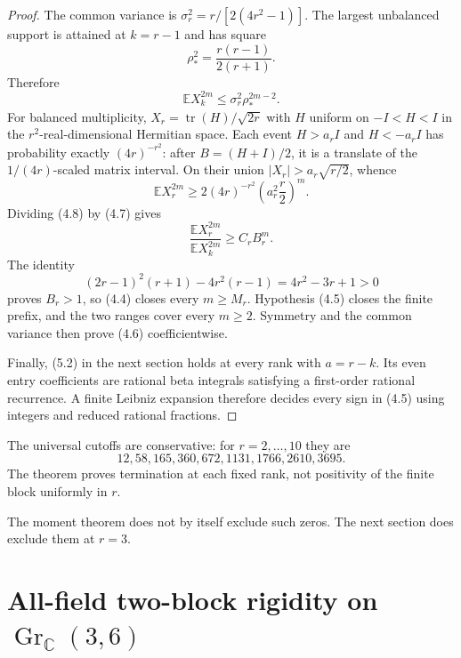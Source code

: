 \documentclass[11pt]{article}
\newcommand{\E}{\mathbb E}
\newcommand{\C}{\mathbb C}
\newcommand{\tr}{\operatorname{tr}}
\newcommand{\Gr}{\operatorname{Gr}}
\begin{document}
\begin{proof}
The common variance is $\sigma_r^2=r/[2(4r^2-1)]$.  The largest unbalanced
support is attained at $k=r-1$ and has square
\[
 \rho_*^2=\frac{r(r-1)}{2(r+1)}.
\]
Therefore
\begin{equation}
 \E X_k^{2m}\le\sigma_r^2\rho_*^{2m-2}.                   \tag{4.7}
\end{equation}
For balanced multiplicity, $X_r=\tr(H)/\sqrt{2r}$ with $H$ uniform on
$-I<H<I$ in the $r^2$-real-dimensional Hermitian space.  Each event
$H>a_rI$ and $H<-a_rI$ has probability exactly $(4r)^{-r^2}$: after
$B=(H+I)/2$, it is a translate of the $1/(4r)$-scaled matrix interval.  On
their union $|X_r|>a_r\sqrt{r/2}$, whence
\begin{equation}
 \E X_r^{2m}\ge2(4r)^{-r^2}\left(a_r^2\frac r2\right)^m. \tag{4.8}
\end{equation}
Dividing (4.8) by (4.7) gives
\begin{equation}
 \frac{\E X_r^{2m}}{\E X_k^{2m}}\ge C_rB_r^m.              \tag{4.9}
\end{equation}
The identity
\[
 (2r-1)^2(r+1)-4r^2(r-1)=4r^2-3r+1>0
\]
proves $B_r>1$, so (4.4) closes every $m\ge M_r$.  Hypothesis (4.5) closes
the finite prefix, and the two ranges cover every $m\ge2$.  Symmetry and the
common variance then prove (4.6) coefficientwise.

Finally, (5.2) in the next section holds at every rank with $a=r-k$.
Its even entry coefficients are rational beta integrals satisfying a
first-order rational recurrence.  A finite Leibniz expansion therefore
decides every sign in (4.5) using integers and reduced rational fractions.
\end{proof}

The universal cutoffs are conservative: for $r=2,\ldots,10$ they are
\begin{equation}
 12,58,165,360,672,1131,1766,2610,3695.                    \tag{4.10}
\end{equation}
The theorem proves termination at each fixed rank, not positivity of the
finite block uniformly in $r$.

The moment theorem does not by itself exclude such zeros.  The next section
does exclude them at $r=3$.

\section{All-field two-block rigidity on \texorpdfstring{$\Gr_{\C}(3,6)$}{GrC(3,6)}}
\end{document}
